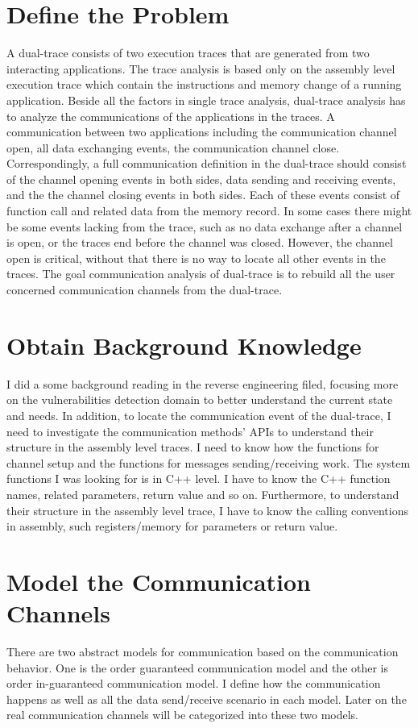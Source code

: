 \section{Define the Problem}
A dual-trace consists of two execution traces that are generated from two interacting applications. The trace analysis is based only on the assembly level execution trace which contain the instructions and memory change of a running application. Beside all the factors in single trace analysis, dual-trace analysis has to analyze the communications of the applications in the traces. A communication between two applications including the communication channel open, all data exchanging events, the communication channel close.  Correspondingly, a full communication definition in the dual-trace should consist of the channel opening events in both sides, data sending and receiving events, and the the channel closing events in both sides. Each of these events consist of function call and related data from the memory record. In some cases there might be some events lacking from the trace, such as no data exchange after a channel is open, or the traces end before the channel was closed. However, the channel open is critical, without that there is no way to locate all other events in the traces. The goal communication analysis of dual-trace is to rebuild all the user concerned communication channels from the dual-trace.


\section{Obtain Background Knowledge}
I did a some background reading in the reverse engineering filed, focusing more on the vulnerabilities detection domain to better understand the current state and needs. In addition, to locate the communication event of the dual-trace, I need to investigate the communication methods' APIs to understand their structure in the assembly level traces. I need to know how the functions for channel setup and the functions for messages sending/receiving work. The system functions I was looking for is in C++ level. I have to know the C++ function names, related parameters, return value and so on. Furthermore, to understand their structure in the assembly level trace, I have to know the calling conventions in assembly, such registers/memory for parameters or return value.

\section{Model the Communication Channels}
There are two abstract models for communication based on the communication behavior. One is the order guaranteed communication model and the other is order in-guaranteed communication model. I define  how the communication happens as well as all the data send/receive scenario in each model. Later on the real communication channels will be categorized into these two models. 


